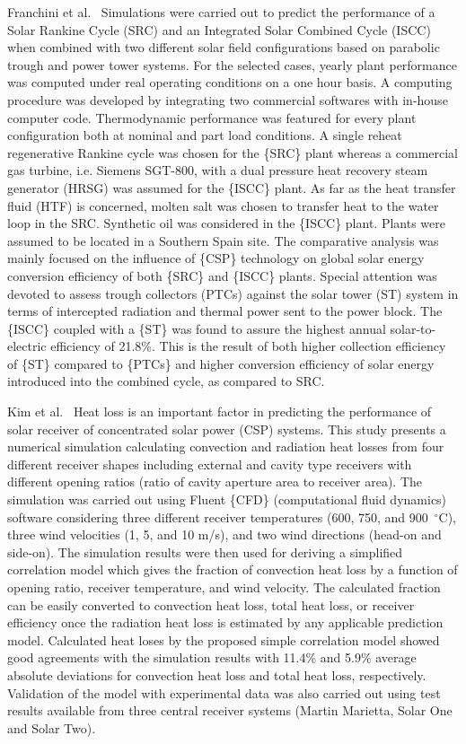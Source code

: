 Franchini et al.~\cite{Franchini2013} Simulations were carried out to predict the performance of a Solar Rankine Cycle (SRC) and an Integrated Solar Combined Cycle (ISCC) when combined with two different solar field configurations based on parabolic trough and power tower systems. For the selected cases, yearly plant performance was computed under real operating conditions on a one hour basis. A computing procedure was developed by integrating two commercial softwares with in-house computer code. Thermodynamic performance was featured for every plant configuration both at nominal and part load conditions. A single reheat regenerative Rankine cycle was chosen for the \{SRC\} plant whereas a commercial gas turbine, i.e. Siemens SGT-800, with a dual pressure heat recovery steam generator (HRSG) was assumed for the \{ISCC\} plant. As far as the heat transfer fluid (HTF) is concerned, molten salt was chosen to transfer heat to the water loop in the SRC. Synthetic oil was considered in the \{ISCC\} plant. Plants were assumed to be located in a Southern Spain site. The comparative analysis was mainly focused on the influence of \{CSP\} technology on global solar energy conversion efficiency of both \{SRC\} and \{ISCC\} plants. Special attention was devoted to assess trough collectors (PTCs) against the solar tower (ST) system in terms of intercepted radiation and thermal power sent to the power block. The \{ISCC\} coupled with a \{ST\} was found to assure the highest annual solar-to-electric efficiency of 21.8\%. This is the result of both higher collection efficiency of \{ST\} compared to \{PTCs\} and higher conversion efficiency of solar energy introduced into the combined cycle, as compared to SRC.


Kim et al.~\cite{Kim2015} Heat loss is an important factor in predicting the performance of solar receiver of concentrated solar power (CSP) systems. This study presents a numerical simulation calculating convection and radiation heat losses from four different receiver shapes including external and cavity type receivers with different opening ratios (ratio of cavity aperture area to receiver area). The simulation was carried out using Fluent \{CFD\} (computational fluid dynamics) software considering three different receiver temperatures (600, 750, and 900 $\,^{\circ}$C), three wind velocities (1, 5, and 10 m/s), and two wind directions (head-on and side-on). The simulation results were then used for deriving a simplified correlation model which gives the fraction of convection heat loss by a function of opening ratio, receiver temperature, and wind velocity. The calculated fraction can be easily converted to convection heat loss, total heat loss, or receiver efficiency once the radiation heat loss is estimated by any applicable prediction model. Calculated heat loses by the proposed simple correlation model showed good agreements with the simulation results with 11.4\% and 5.9\% average absolute deviations for convection heat loss and total heat loss, respectively. Validation of the model with experimental data was also carried out using test results available from three central receiver systems (Martin Marietta, Solar One and Solar Two).

